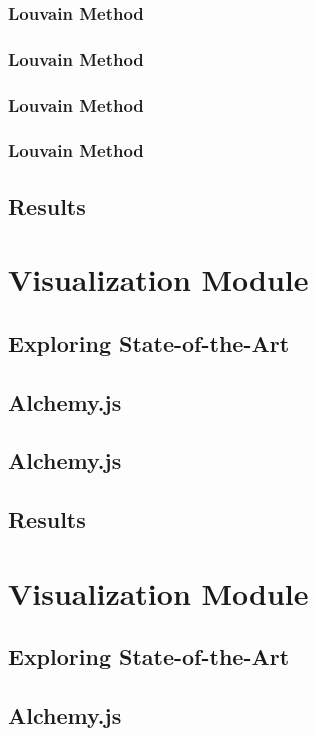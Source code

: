 \documentclass{beamer}
\begin{document}
\subsubsection[Phase1]{Louvain Method} \frame{}
\subsubsection[Phase2]{Louvain Method} \frame{}
\subsubsection[Observations]{Louvain Method} \frame{}
\subsubsection[Experiments]{Louvain Method} \frame{}
\subsection{Results} \frame{}


\section{Visualization Module}
\subsection{Exploring State-of-the-Art} \frame{}
\subsection{Alchemy.js} \frame{}
\subsection[Experiments]{Alchemy.js} \frame{}
\subsection{Results} \frame{}

\section{Visualization Module}
\subsection{Exploring State-of-the-Art} \frame{}
\subsection{Alchemy.js} \frame{}
\end{document}
